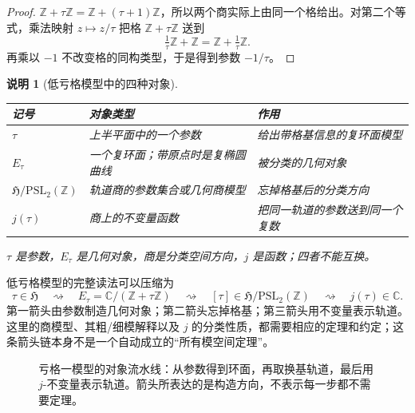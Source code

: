 \documentclass[UTF8,fontset=none,a4paper,11pt]{ctexart}
\theoremstyle{foundation-definition}
\theoremstyle{foundation-theorem}
\theoremstyle{foundation-proposition}
\theoremstyle{foundation-example}
\theoremstyle{foundation-remark}
\newtheorem{remark}[definition]{说明}
\theoremstyle{foundation-theorem}
\newcommand{\C}{\mathbb C}
\newcommand{\Z}{\mathbb Z}
\begin{document}
\begin{proof}
\(\mathbb Z+\tau\mathbb Z=\mathbb Z+(\tau+1)\mathbb Z\)，所以两个商实际上由同一个格给出。对第二个等式，乘法映射 \(z\mapsto z/\tau\) 把格 \(\mathbb Z+\tau\mathbb Z\) 送到
\[
\tfrac1\tau\mathbb Z+\mathbb Z
=\mathbb Z+\tfrac1\tau\mathbb Z.
\]
再乘以 \(-1\) 不改变格的同构类型，于是得到参数 \(-1/\tau\)。
\end{proof}

\begin{remark}[低亏格模型中的四种对象]
\begin{center}
{\small
\setlength{\tabcolsep}{4pt}
\begin{tabularx}{\textwidth}{p{}|p{}|X}
\toprule
记号 & 对象类型 & 作用 \\
\midrule
\(\tau\) & 上半平面中的一个参数 & 给出带格基信息的复环面模型 \\
\(E_\tau\) & 一个复环面；带原点时是复椭圆曲线 & 被分类的几何对象 \\
\(\mathfrak H/\mathrm{PSL}_2(\mathbb Z)\) & 轨道商的参数集合或几何商模型 & 忘掉格基后的分类方向 \\
\(j(\tau)\) & 商上的不变量函数 & 把同一轨道的参数送到同一个复数 \\
\bottomrule
\end{tabularx}}
\end{center}
\(\tau\) 是参数，\(E_\tau\) 是几何对象，商是分类空间方向，\(j\) 是函数；四者不能互换。
\end{remark}

低亏格模型的完整读法可以压缩为
\[
\tau\in\mathfrak H
\quad\rightsquigarrow\quad
E_\tau=\C/(\Z+\tau\Z)
\quad\rightsquigarrow\quad
[\tau]\in\mathfrak H/\mathrm{PSL}_2(\mathbb Z)
\quad\rightsquigarrow\quad
j(\tau)\in\C.
\]
第一箭头由参数制造几何对象；第二箭头忘掉格基；第三箭头用不变量表示轨道。这里的商模型、其粗/细模解释以及 \(j\) 的分类性质，都需要相应的定理和约定；这条箭头链本身不是一个自动成立的“所有模空间定理”。

\begin{figure}[htbp]
\centering
{}
\caption{亏格一模型的对象流水线：从参数得到环面，再取换基轨道，最后用 \(j\)-不变量表示轨道。箭头所表达的是构造方向，不表示每一步都不需要定理。}
\label{fig:modular-object-pipeline}
\end{figure}
\end{document}
